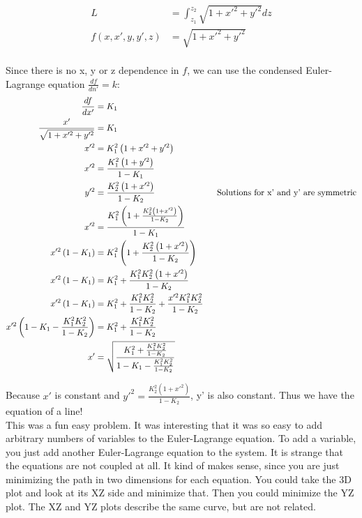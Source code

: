 \documentclass[10pt]{article} %
\begin{document}
\begin{align*}
  L &= \int_{z_1}^{z_2} \sqrt{1 + x'^2 + y'^2} dz\\
  f(x, x', y, y', z) &= \sqrt{1 + x'^2 + y'^2}\\
\end{align*}

Since there is no x, y or z dependence in $f$, we can use the condensed Euler-Lagrange equation $\frac{df}{dn'} = k$:\\

\begin{align*}
  \frac{df}{dx'} &= K_1\\
  \frac{x'}{\sqrt{1 + x'^2 + y'^2}} &= K_1\\
  x'^2 &= K_1^2\left(1 + x'^2 + y'^2\right)\\
  x'^2 &= \frac{K_1^2\left(1 + y'^2\right)}{1-K_1}\\
  y'^2 &= \frac{K_2^2\left(1 + x'^2\right)}{1-K_2}
  \hspace*{1in} \mbox{Solutions for x' and y' are symmetric}\\
  x'^2 &= \frac{K_1^2\left(1 + \frac{K_2^2\left(1 + x'^2\right)}{1-K_2}\right)}{1-K_1}\\
  x'^2\left(1-K_1\right) &= K_1^2\left(1 + \frac{K_2^2\left(1 + x'^2\right)}{1-K_2}\right)\\
  x'^2\left(1-K_1\right) &= K_1^2 + \frac{K_1^2K_2^2\left(1 + x'^2\right)}{1-K_2}\\
  x'^2\left(1-K_1\right) &= K_1^2 + \frac{K_1^2K_2^2}{1-K_2} + \frac{x'^2K_1^2K_2^2}{1-K_2}\\
  x'^2\left(1-K_1 - \frac{K_1^2K_2^2}{1-K_2}\right) &= K_1^2 + \frac{K_1^2K_2^2}{1-K_2}\\
  x' &= \sqrt{\frac{K_1^2 + \frac{K_1^2K_2^2}{1-K_2}}{1-K_1 - \frac{K_1^2K_2^2}{1-K_2}}}\\
\end{align*}

Because $x'$ is constant and $y'^2 = \frac{K_2^2\left(1 + x'^2\right)}{1-K_2}$, y' is also constant. Thus we have the equation of a line!\\

This was a fun easy problem. It was interesting that it was so easy to add arbitrary numbers of variables to the Euler-Lagrange equation. To add a variable, you just add another Euler-Lagrange equation to the system. It is strange that the equations are not coupled at all. It kind of makes sense, since you are just minimizing the path in two dimensions for each equation. You could take the 3D plot and look at its XZ side and minimize that. Then you could minimize the YZ plot. The XZ and YZ plots describe the same curve, but are not related.
\end{document}
